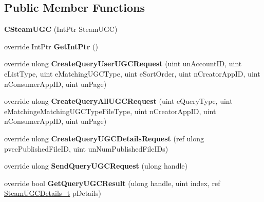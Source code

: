 \subsection*{Public Member Functions}
\begin{DoxyCompactItemize}
\item 
\hypertarget{classValve_1_1Steamworks_1_1CSteamUGC_a5945d374eb763d9376472d6340903560}{}{\bfseries C\+Steam\+U\+G\+C} (Int\+Ptr Steam\+U\+G\+C)\label{classValve_1_1Steamworks_1_1CSteamUGC_a5945d374eb763d9376472d6340903560}

\item 
\hypertarget{classValve_1_1Steamworks_1_1CSteamUGC_a356eb6c6f95390f69e6217c79d17e17d}{}override Int\+Ptr {\bfseries Get\+Int\+Ptr} ()\label{classValve_1_1Steamworks_1_1CSteamUGC_a356eb6c6f95390f69e6217c79d17e17d}

\item 
\hypertarget{classValve_1_1Steamworks_1_1CSteamUGC_af199f097a19b3ce191d3326d380c9183}{}override ulong {\bfseries Create\+Query\+User\+U\+G\+C\+Request} (uint un\+Account\+I\+D, uint e\+List\+Type, uint e\+Matching\+U\+G\+C\+Type, uint e\+Sort\+Order, uint n\+Creator\+App\+I\+D, uint n\+Consumer\+App\+I\+D, uint un\+Page)\label{classValve_1_1Steamworks_1_1CSteamUGC_af199f097a19b3ce191d3326d380c9183}

\item 
\hypertarget{classValve_1_1Steamworks_1_1CSteamUGC_a7f4aa2f9b192f1e7e6931516c4898f51}{}override ulong {\bfseries Create\+Query\+All\+U\+G\+C\+Request} (uint e\+Query\+Type, uint e\+Matchinge\+Matching\+U\+G\+C\+Type\+File\+Type, uint n\+Creator\+App\+I\+D, uint n\+Consumer\+App\+I\+D, uint un\+Page)\label{classValve_1_1Steamworks_1_1CSteamUGC_a7f4aa2f9b192f1e7e6931516c4898f51}

\item 
\hypertarget{classValve_1_1Steamworks_1_1CSteamUGC_a67d4b68225bd0e370f6ac6a13699c4d5}{}override ulong {\bfseries Create\+Query\+U\+G\+C\+Details\+Request} (ref ulong pvec\+Published\+File\+I\+D, uint un\+Num\+Published\+File\+I\+Ds)\label{classValve_1_1Steamworks_1_1CSteamUGC_a67d4b68225bd0e370f6ac6a13699c4d5}

\item 
\hypertarget{classValve_1_1Steamworks_1_1CSteamUGC_ab35b0ca91f70241482df96e7c4b8a097}{}override ulong {\bfseries Send\+Query\+U\+G\+C\+Request} (ulong handle)\label{classValve_1_1Steamworks_1_1CSteamUGC_ab35b0ca91f70241482df96e7c4b8a097}

\item 
\hypertarget{classValve_1_1Steamworks_1_1CSteamUGC_a76ff5eeb3ad4be0ca737095b574395aa}{}override bool {\bfseries Get\+Query\+U\+G\+C\+Result} (ulong handle, uint index, ref \hyperlink{structValve_1_1Steamworks_1_1SteamUGCDetails__t}{Steam\+U\+G\+C\+Details\+\_\+t} p\+Details)\label{classValve_1_1Steamworks_1_1CSteamUGC_a76ff5eeb3ad4be0ca737095b574395aa}


\end{DoxyCompactItemize}
